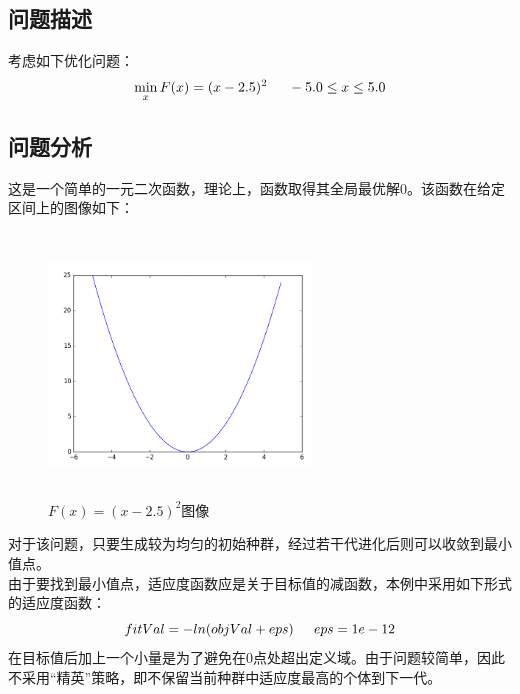 \documentclass[UTF8]{ctexart}
\begin{document}
\subsection{问题描述}
考虑如下优化问题：
\begin{equation}
	\min_x F(x) = (x-2.5)^2 \indent -5.0 \leq x \leq 5.0 
\end{equation}

\subsection{问题分析}
这是一个简单的一元二次函数，理论上，函数取得其全局最优解0。该函数在给定区间上的图像如下：
\begin{figure}[htbp]\centering
\includegraphics [width=7cm,height=7cm]{../pic/T1-1_func.png} 
\caption{$F(x) = (x-2.5)^2$图像}
\end{figure}
\indent 对于该问题，只要生成较为均匀的初始种群，经过若干代进化后则可以收敛到最小值点。\\
\indent 由于要找到最小值点，适应度函数应是关于目标值的减函数，本例中采用如下形式的适应度函数：
\begin{equation}
	fitVal=-ln(objVal+eps) \indent eps=1e-12
\end{equation}
\indent 在目标值后加上一个小量是为了避免在0点处超出定义域。由于问题较简单，因此不采用“精英”策略，即不保留当前种群中适应度最高的个体到下一代。
\end{document}
